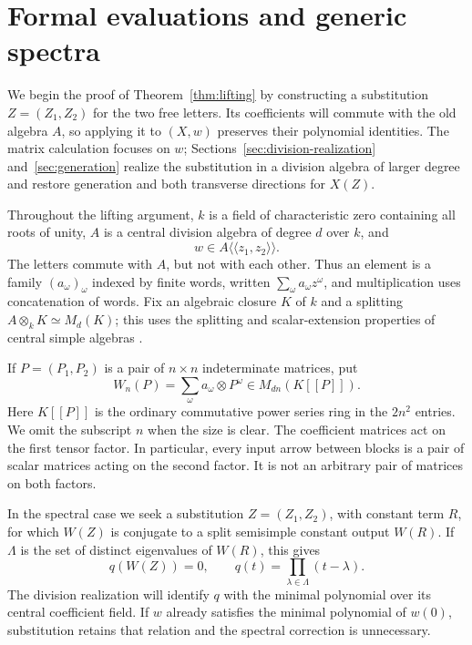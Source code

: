 \section{Formal evaluations and generic spectra}\label{sec:formal-generic}

We begin the proof of Theorem~\ref{thm:lifting} by constructing a
substitution $Z=(Z_1,Z_2)$ for the two free letters. Its coefficients will commute
with the old algebra $A$, so applying it to $(X,w)$ preserves their
polynomial identities. The matrix calculation focuses on $w$;
Sections~\ref{sec:division-realization} and~\ref{sec:generation}
realize the substitution in a division algebra of larger degree and
restore generation and both transverse directions for $X(Z)$.

Throughout the lifting argument, $k$ is a field of characteristic zero
containing all roots of unity, $A$ is a central division algebra of degree
$d$ over $k$, and
\[
 w\in A\langle\!\langle z_1,z_2\rangle\!\rangle.
\]
The letters commute with $A$, but not with each other.  Thus an element
is a family $(a_\omega)_\omega$ indexed by finite words, written
$\sum_\omega a_\omega z^\omega$, and multiplication uses concatenation
of words.  Fix an algebraic closure $K$ of $k$ and a splitting
$A\otimes_k K\simeq M_d(K)$; this uses the splitting and
scalar-extension properties of central simple algebras
\cite[Chapter~IV, Example~2.14(a) and Proposition~2.15]{MilneCFT}.

If $P=(P_1,P_2)$ is a pair of $n\times n$ indeterminate matrices, put
\[
 W_n(P)=\sum_\omega a_\omega\otimes P^\omega
       \in M_{dn}(K[[P]]).
\]
Here $K[[P]]$ is the ordinary commutative power series ring in the
$2n^2$ entries.  We omit the subscript $n$ when the size is clear.
The coefficient matrices act on the first tensor factor.  In
particular, every input arrow between blocks is a pair of scalar
matrices acting on the second factor.  It is not an arbitrary pair of
matrices on both factors.

In the spectral case we seek a substitution $Z=(Z_1,Z_2)$, with
constant term $R$, for which $W(Z)$ is conjugate to a split semisimple
constant output $W(R)$. If $\Lambda$ is the set of distinct eigenvalues
of $W(R)$, this gives
\[
 q(W(Z))=0,\qquad q(t)=\prod_{\lambda\in\Lambda}(t-\lambda).
\]
The division realization will identify $q$ with the minimal polynomial
over its central coefficient field. If $w$ already satisfies the
minimal polynomial of $w(0)$, substitution retains that relation and
the spectral correction is unnecessary.

